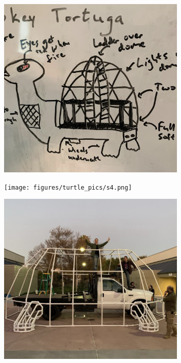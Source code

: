 \documentclass[12pt]{book}
\begin{document}
\begin{figure}
    \centering
    \includegraphics[width=0.8\textwidth]{figures/turtle_pics/s3.png}
\end{figure}

\begin{figure}
    \centering
    \texttt{[image: figures/turtle\_pics/s4.png]}
\end{figure}

\begin{figure}
    \centering
    \includegraphics[width=0.8\textwidth]{figures/turtle_pics/s5.png}
\end{figure}
\end{document}
